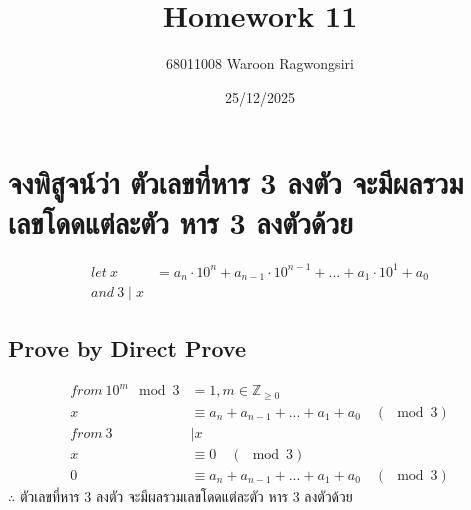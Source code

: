 \documentclass{article}
\title{Homework 11}
\author{68011008 Waroon Ragwongsiri}
\date{25/12/2025}
\begin{document}
\maketitle

{\small
\section{จงพิสูจน์ว่า ตัวเลขที่หาร 3 ลงตัว จะมีผลรวมเลขโดดแต่ละตัว หาร 3 ลงตัวด้วย}
}
\begin{align}
	let \ x &= a_n \cdot 10^{n} + a_{n-1} \cdot 10^{n-1} + ... + a_1 \cdot 10^{1} + a_0 \\
	and \ 3 \mid x
\end{align}
\subsection{Prove by Direct Prove}
\begin{align}
	from\ 10^{m} \mod 3 &= 1, m \in \mathbb{Z}_{\geq0} \\
	x &\equiv a_n + a_{n-1} + ... + a_1 + a_0 \quad ( \mod 3) \\
	from \ 3 &\mid x \\
	x &\equiv 0 \quad ( \mod 3)\\
	0 &\equiv a_n + a_{n-1} + ... + a_1 + a_0 \quad ( \mod 3)
\end{align}
$\therefore$ ตัวเลขที่หาร 3 ลงตัว จะมีผลรวมเลขโดดแต่ละตัว หาร 3 ลงตัวด้วย
\end{document}

